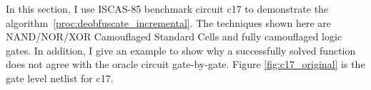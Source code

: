 \documentclass[thesis]{umassthesis}  %
\begin{document}
In this section, I use ISCAS-85 benchmark circuit c17 to demonstrate the algorithm~\ref{proc:deobfuscate_incremental}. The techniques shown here are NAND/NOR/XOR Camouflaged Standard Cells and fully camouflaged logic gates. In addition, I give an example to show why a successfully solved function does not agree with the oracle circuit gate-by-gate. Figure \ref{fig:c17_original} is the gate level netlist for c17.

\end{document}
